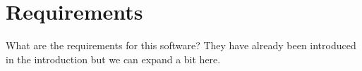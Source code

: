 \section{Requirements}

What are the requirements for this software?
They have already been introduced in the introduction but we can expand a bit here.


